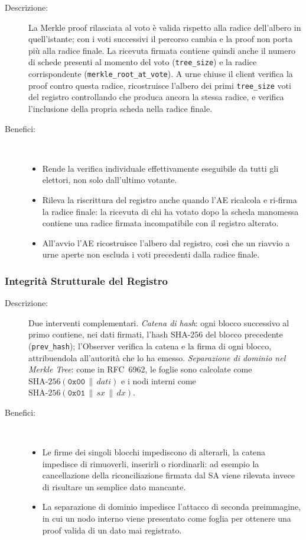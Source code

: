 \documentclass[12pt,a4paper]{article}
\begin{document}
\begin{description}
  \item[Descrizione:] La Merkle proof rilasciata al voto è valida rispetto alla radice dell'albero in quell'istante; con i voti successivi il percorso cambia e la proof non porta più alla radice finale. La ricevuta firmata contiene quindi anche il numero di schede presenti al momento del voto (\texttt{tree\_size}) e la radice corrispondente (\texttt{merkle\_root\_at\_vote}). A urne chiuse il client verifica la proof contro questa radice, ricostruisce l'albero dei primi \texttt{tree\_size} voti del registro controllando che produca ancora la stessa radice, e verifica l'inclusione della propria scheda nella radice finale.
  \item[Benefici:] \
    \begin{itemize}
      \item Rende la verifica individuale effettivamente eseguibile da tutti gli elettori, non solo dall'ultimo votante.
      \item Rileva la riscrittura del registro anche quando l'AE ricalcola e ri-firma la radice finale: la ricevuta di chi ha votato dopo la scheda manomessa contiene una radice firmata incompatibile con il registro alterato.
      \item All'avvio l'AE ricostruisce l'albero dal registro, così che un riavvio a urne aperte non escluda i voti precedenti dalla radice finale.
    \end{itemize}
\end{description}

\subsubsection{Integrità Strutturale del Registro}
\label{sec:mod37}

\begin{description}
  \item[Descrizione:] Due interventi complementari. \emph{Catena di hash}: ogni blocco successivo al primo contiene, nei dati firmati, l'hash SHA-256 del blocco precedente (\texttt{prev\_hash}); l'Observer verifica la catena e la firma di ogni blocco, attribuendola all'autorità che lo ha emesso. \emph{Separazione di dominio nel Merkle Tree}: come in RFC~6962, le foglie sono calcolate come $\mathrm{SHA\text{-}256}(\mathtt{0x00} \,\|\, \mathit{dati})$ e i nodi interni come $\mathrm{SHA\text{-}256}(\mathtt{0x01} \,\|\, \mathit{sx} \,\|\, \mathit{dx})$.
  \item[Benefici:] \
    \begin{itemize}
      \item Le firme dei singoli blocchi impediscono di alterarli, la catena impedisce di rimuoverli, inserirli o riordinarli: ad esempio la cancellazione della riconciliazione firmata dal SA viene rilevata invece di risultare un semplice dato mancante.
      \item La separazione di dominio impedisce l'attacco di seconda preimmagine, in cui un nodo interno viene presentato come foglia per ottenere una proof valida di un dato mai registrato.
    \end{itemize}
\end{description}
\end{document}
